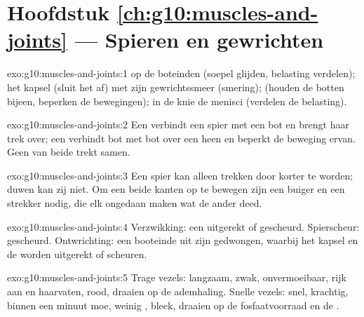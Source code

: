 \section*{Hoofdstuk \ref{ch:g10:muscles-and-joints} --- Spieren en gewrichten}

\begin{solution}{exo:g10:muscles-and-joints:1}
 op de boteinden (soepel glijden, belasting verdelen); het
kapsel (sluit het  af) met zijn gewrichtssmeer (smering);
 (houden de botten bijeen, beperken de bewegingen); in de
knie de menisci (verdelen de belasting).
\end{solution}

\begin{solution}{exo:g10:muscles-and-joints:2}
Een  verbindt een spier met een bot en brengt haar trek over; een
 verbindt bot met bot over een  heen en beperkt de
beweging ervan. Geen van beide trekt samen.
\end{solution}

\begin{solution}{exo:g10:muscles-and-joints:3}
Een spier kan alleen trekken door korter te worden; duwen kan zij niet.
Om een  beide kanten op te bewegen zijn een buiger en een
strekker nodig, die elk ongedaan maken wat de ander deed.
\end{solution}

\begin{solution}{exo:g10:muscles-and-joints:4}
Verzwikking: een  uitgerekt of gescheurd. Spierscheur:
 gescheurd. Ontwrichting: een booteinde uit zijn 
gedwongen, waarbij het kapsel en de  worden uitgerekt of
scheuren.
\end{solution}

\begin{solution}{exo:g10:muscles-and-joints:5}
Trage vezels: langzaam, zwak, onvermoeibaar, rijk aan  en
haarvaten, rood, draaien op de ademhaling. Snelle vezels: snel, krachtig,
binnen een minuut moe, weinig , bleek, draaien op de
fosfaatvoorraad en de .
\end{solution}

